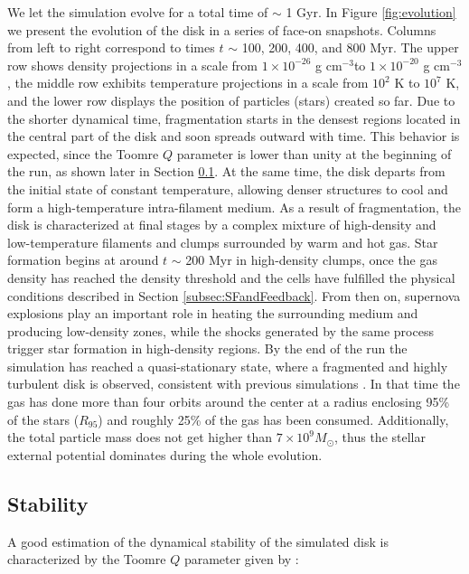 \documentclass[twocolumn]{aastex}
\newcommand{\cmmm}{cm$^{-3}$}
\newcommand{\msun}{M_\odot}
\begin{document}
We let the simulation evolve for a total time of $\sim$ 1 Gyr. In Figure \ref{fig:evolution} we present the evolution of the disk in a series of face-on snapshots. Columns from left to right correspond to times $t$ $\sim$ 100, 200, 400, and 800 Myr. The upper row shows density projections in a scale from $1 \times 10^{-26}$ g \cmmm to $1\times10^{-20}$ g \cmmm, the middle row exhibits temperature projections in a scale from $10^2$ K to $10^7$ K, and the lower row displays the position of particles (stars) created so far. Due to the shorter dynamical time, fragmentation starts in the densest regions located in the central part of the disk and soon spreads outward with time. This behavior is expected, since the Toomre $Q$ parameter \citep{Toomre_64} is lower than unity at the beginning of the run, as shown later in Section \ref{subsec:stability}. At the same time, the disk departs from the initial state of constant temperature, allowing denser structures to cool and form a high-temperature intra-filament medium. As a result of fragmentation, the disk is characterized at final stages by a complex mixture of high-density and low-temperature filaments and clumps surrounded by warm and hot gas. Star formation begins at around $t$ $\sim$ 200 Myr in high-density clumps, once the gas density has reached the density threshold and the cells have fulfilled the physical conditions described in Section \ref{subsec:SFandFeedback}. From then on, supernova explosions play an important role in heating the surrounding medium and producing low-density zones, while the shocks generated by the same process trigger star formation in high-density regions. By the end of the run the simulation has reached a quasi-stationary state, where a fragmented and highly turbulent disk is observed, consistent with previous simulations \citep{Wada_01, Tasker_Bryan_06}. In that time the gas has done more than four orbits around the center at a radius enclosing 95\% of the stars ($R_{95}$) and roughly 25\% of the gas has been consumed. Additionally, the total particle mass does not get higher than $7 \times 10^9 \msun$, thus the stellar external potential dominates during the whole evolution.

\subsection{Stability}
\label{subsec:stability}

A good estimation of the dynamical stability of the simulated disk is characterized by the Toomre $Q$ parameter \citep{Toomre_64, Goldreich_65} given by \citep{Leroy_08}:
\end{document}
